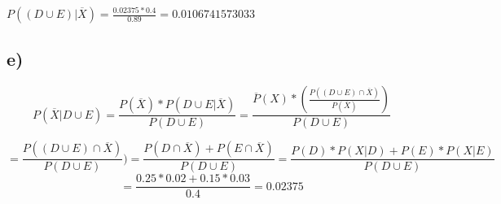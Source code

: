 \documentclass[]{article}
\begin{document}
$P( (D \cup E) | \overline{X} ) = \frac{0.02375 * 0.4}{0.89} = 0.0106741573033 $

\subsection{e)}

$$P (\overline{X} | D \cup E)  =\frac { P (\overline{X}) * P(D \cup E | \overline{X})  }{P(D \cup E)} =\frac{ \overline{P}(X) * (\frac{ P((D \cup E )\cap \overline{X})}{P(\overline{X})} )}{P(D \cup E)} $$


$$= \frac{ P( (D \cup E) \cap \overline{X})}{ P (D \cup E )}   ) = \frac{ P (D \cap \overline{X}) + P( E \cap \overline{X} ) }{ P  (D \cup E)} =\frac{  P(D) * P(X|D) + P(E) * P(X|E) }{P(D \cup E)}$$ $$ =\frac{0.25 * 0.02 + 0.15 * 0.03}{0.4} = 0.02375 $$
\end{document}
